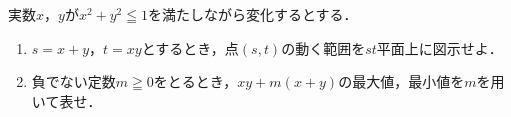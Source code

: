 \documentclass[../../main.tex]{subfiles}
\begin{document}
実数$x$，$y$が$x^2+y^2 \leqq 1$を満たしながら変化するとする．
\begin{enumerate}
  \item $s=x+y$，$t=xy$とするとき，点$(s,t)$の動く範囲を$st$平面上に図示せよ．
  \item 負でない定数$m \geqq 0$をとるとき，$xy+m(x+y)$の最大値，最小値を$m$を用いて表せ．
\end{enumerate}
\end{document}
